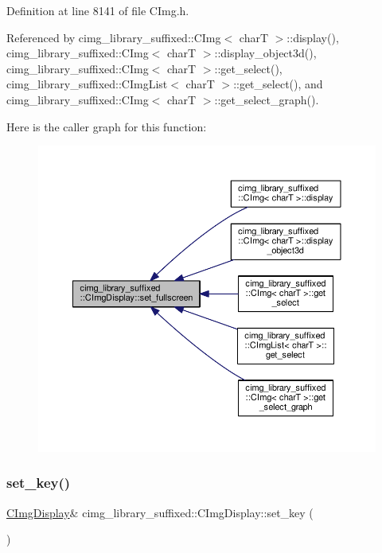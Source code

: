 Definition at line 8141 of file C\+Img.\+h.



Referenced by cimg\+\_\+library\+\_\+suffixed\+::\+C\+Img$<$ char\+T $>$\+::display(), cimg\+\_\+library\+\_\+suffixed\+::\+C\+Img$<$ char\+T $>$\+::display\+\_\+object3d(), cimg\+\_\+library\+\_\+suffixed\+::\+C\+Img$<$ char\+T $>$\+::get\+\_\+select(), cimg\+\_\+library\+\_\+suffixed\+::\+C\+Img\+List$<$ char\+T $>$\+::get\+\_\+select(), and cimg\+\_\+library\+\_\+suffixed\+::\+C\+Img$<$ char\+T $>$\+::get\+\_\+select\+\_\+graph().

Here is the caller graph for this function\+:
\nopagebreak
\begin{figure}[H]
\begin{center}
\leavevmode
\includegraphics[width=350pt]{d5/d53/structcimg__library__suffixed_1_1CImgDisplay_ad36ec47ee020691298c13340ca35da39_icgraph}
\end{center}
\end{figure}
\mbox{\label{structcimg__library__suffixed_1_1CImgDisplay_a23693d0cc3adc326739bafdc0f3ad3ed}} 
\subsubsection{\texorpdfstring{set\+\_\+key()}{set\_key()}\hspace{0.1cm}{\footnotesize\ttfamily [1/2]}}
{\footnotesize\ttfamily \hyperlink{structcimg__library__suffixed_1_1CImgDisplay}{C\+Img\+Display}\& cimg\+\_\+library\+\_\+suffixed\+::\+C\+Img\+Display\+::set\+\_\+key (\begin{DoxyParamCaption}{ }\end{DoxyParamCaption})\hspace{0.3cm}{\ttfamily [inline]}}



